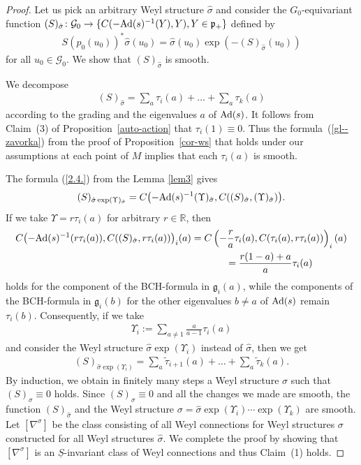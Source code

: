\documentclass[10pt,a4paper]{amsart}
\newcommand{\si}{\sigma}
\newcommand{\un}{\underline}
\newcommand{\ba}{\mathcal{G}}
\newcommand{\fg}{\mathfrak g}
\newcommand{\fp}{\mathfrak p}
\newcommand{\Ad}{{\rm Ad}}
\newcommand{\U}{\Upsilon}
\numberwithin{equation}{section}
\begin{document}
\begin{proof}
Let us pick an arbitrary Weyl structure $\hat \si$ and consider the $G_0$-equivariant function $(S)_{\hat \si}\colon \ba_0\to \{C(-\Ad(s)^{-1}(Y),Y), Y\in \fp_+\}$ def\/ined by \begin{gather*}S(p_0(u_0))^*\hat \si(u_0)=\hat \si(u_0)\exp(-(S)_{\hat \si}(u_0))\end{gather*}
for all $u_0\in \ba_0$. We show that $(S)_{\hat \si}$ is smooth.

We decompose
\begin{gather*}(S)_{\hat \si}=\sum_a\tau_i(a)+\dots+\sum_a\tau_k(a)\end{gather*}
according to the grading and the eigenvalues $a$ of $\Ad(s)$. It follows from Claim~(3) of Proposi\-tion~\ref{auto-action} that $\tau_i(1)\equiv 0$. Thus the formula~(\ref{gl--zavorka}) from the proof of Proposition~\ref{cor-ws} that holds under our assumptions at each point of $M$ implies that each $\tau_i(a)$ is smooth.

The formula (\ref{2.4.}) from the Lemma \ref{lem3} gives \begin{gather*}(S)_{\hat \si\exp (\U)_{\hat \si}}=C\big({-}\Ad(s)^{-1}(\U)_{\hat \si},C((S)_{\hat \si},(\U)_{\hat \si})\big).\end{gather*}
If we take $\U=r\tau_i(a)$ for arbitrary $r\in \mathbb{R}$, then
\begin{gather*}C\big({-}\Ad(s)^{-1}(r \tau_i(a)),C((S)_{\hat \si},r\tau_i(a))\big)_i(a) = C\left(-\frac{r}{a} \tau_i(a),C(\tau_i(a),r\tau_i(a))\right)_i(a)\\
\hphantom{C\big({-}\Ad(s)^{-1}(r \tau_i(a)),C((S)_{\hat \si},r\tau_i(a))\big)_i(a)}{} =
\frac{r(1-a)+a}{a}\tau_i(a)
\end{gather*}
holds for the component of the BCH-formula in $\fg_i(a)$, while the components of the BCH-for\-mu\-la in $\fg_i(b)$ for the other eigenvalues $b\neq a$ of $\Ad(s)$ remain $\tau_i(b)$. Consequently, if we take \begin{gather*}\U_i:=\sum_{a\neq 1} \frac{a}{a-1}\tau_i(a) \end{gather*} and consider the Weyl structure $\hat \si\exp (\U_i)$ instead of $\hat \si$, then we get
\begin{gather*}(S)_{\hat \si\exp (\U_i)}=\sum_a\tilde \tau_{i+1}(a)+\dots+\sum_a\tilde \tau_k(a).\end{gather*}
By induction, we obtain in f\/initely many steps a Weyl structure $\si$ such that $(S)_\si\equiv 0$ holds. Since $(S)_\si\equiv 0$ and all the changes we made are smooth, the function $(S)_{\hat \si}$ and the Weyl structure $\si=\hat \si\exp(\U_i)\cdots \exp(\U_k)$ are smooth.
Let $[\nabla^\si]$ be the class consisting of all Weyl connections for Weyl structures $\si$ constructed for all Weyl structures $\hat \si$. We complete the proof by showing that $[\nabla^\si]$ is an $\un S$-invariant class of Weyl connections and thus Claim~(1) holds.


\end{proof}
\end{document}

